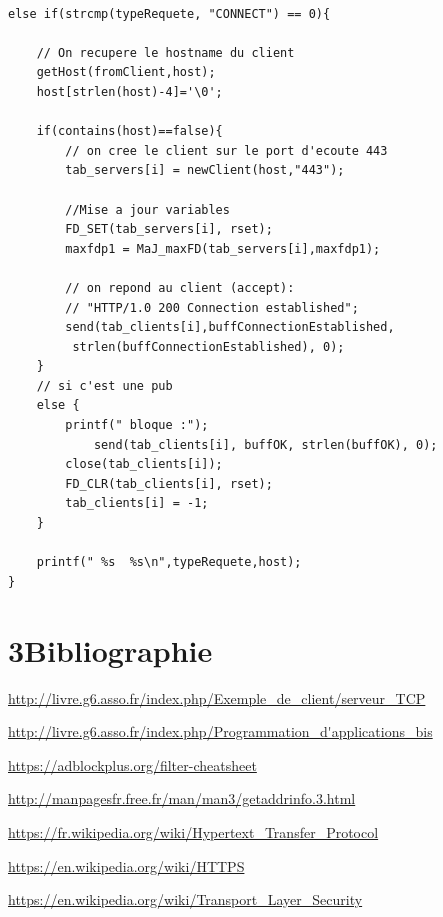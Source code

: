 \documentclass[12pt, a4paper]{report}
\begin{document}
\renewcommand{\lstlistingname}{Algorithme}
\begin{lstlisting}[caption=Partie gérant l'HTTPS issue du CONNECT.]

else if(strcmp(typeRequete, "CONNECT") == 0){
			
	// On recupere le hostname du client
	getHost(fromClient,host);
	host[strlen(host)-4]='\0';
	
	if(contains(host)==false){
		// on cree le client sur le port d'ecoute 443
		tab_servers[i] = newClient(host,"443");

		//Mise a jour variables
		FD_SET(tab_servers[i], rset);
		maxfdp1 = MaJ_maxFD(tab_servers[i],maxfdp1);
		
		// on repond au client (accept): 
		// "HTTP/1.0 200 Connection established";
  		send(tab_clients[i],buffConnectionEstablished,
  		 strlen(buffConnectionEstablished), 0);
	}
	// si c'est une pub
	else {
		printf(" bloque :");
			send(tab_clients[i], buffOK, strlen(buffOK), 0);
		close(tab_clients[i]);
		FD_CLR(tab_clients[i], rset);
		tab_clients[i] = -1;
	}

	printf(" %s  %s\n",typeRequete,host);
}

\end{lstlisting}


\chapter*{3\hspace{1cm}Bibliographie}

\hspace{0.6cm}

\url{http://livre.g6.asso.fr/index.php/Exemple_de_client/serveur_TCP}

\url{http://livre.g6.asso.fr/index.php/Programmation_d'applications_bis}

\url{https://adblockplus.org/filter-cheatsheet}

\url{http://manpagesfr.free.fr/man/man3/getaddrinfo.3.html}

\url{https://fr.wikipedia.org/wiki/Hypertext_Transfer_Protocol}

\url{https://en.wikipedia.org/wiki/HTTPS}

\url{https://en.wikipedia.org/wiki/Transport_Layer_Security}
\end{document}
